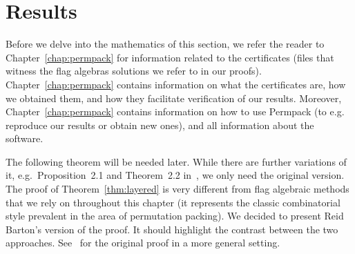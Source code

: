\documentclass[12pt, a4paper, twoside]{report}
\begin{document}
\section{Results}
\label{sec:mainresults}

Before we delve into the mathematics of this section, we refer the reader to Chapter~\ref{chap:permpack} for information related to the certificates (files that witness the flag algebras solutions we refer to in our proofs). Chapter~\ref{chap:permpack} contains information on what the certificates are, how we obtained them, and how they facilitate verification of our results. Moreover, Chapter~\ref{chap:permpack} contains information on how to use Permpack (to e.g. reproduce our results or obtain new ones), and all information about the software.

The following theorem will be needed later. While there are further variations of it, e.g.~Proposition~2.1 and Theorem~2.2 in~\cite{albert2002packing}, we only need the original version. The proof of Theorem~\ref{thm:layered} is very different from flag algebraic methods that we rely on throughout this chapter (it represents the classic combinatorial style prevalent in the area of permutation packing). We decided to present Reid Barton's version of the proof. It should highlight the contrast between the two approaches. See~\cite{barton2004packing} for the original proof in a more general setting.
\end{document}
